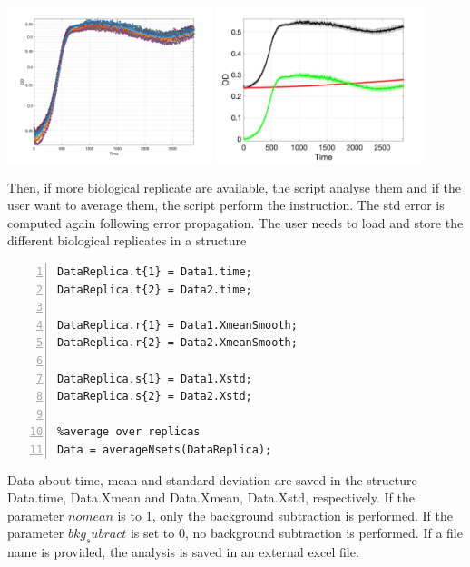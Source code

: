 \documentclass{article}
\begin{document}
\begin{center}
\includegraphics[width=0.45\textwidth]{e1} 
\includegraphics[width=0.45\textwidth]{e2} 
\end{center}
Then, if more biological replicate are available, the script analyse them and if the user want to average them, the script perform the instruction. The std error is computed again following error propagation. The user needs to load and store the different biological replicates in a structure
\begin{lstlisting}[frame=single,numbers=left,style=Matlab-Pyglike]
DataReplica.t{1} = Data1.time;
DataReplica.t{2} = Data2.time;

DataReplica.r{1} = Data1.XmeanSmooth;
DataReplica.r{2} = Data2.XmeanSmooth;

DataReplica.s{1} = Data1.Xstd;
DataReplica.s{2} = Data2.Xstd;

%average over replicas
Data = averageNsets(DataReplica);
\end{lstlisting}

Data about time, mean and standard deviation are saved in the structure Data.time, Data.Xmean and Data.Xmean, Data.Xstd, respectively. If the parameter $nomean$ is to 1, only the background subtraction is performed. If the parameter $bkg_subract$ is set to 0, no background subtraction is performed. If a file name is provided, the analysis is saved in an external excel file.
\end{document}
